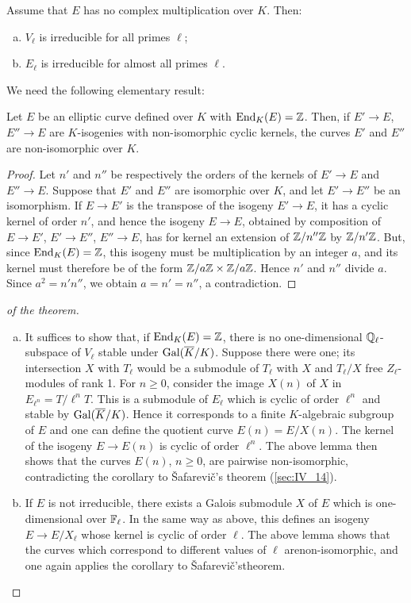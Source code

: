 \begin{thm}
Assume that $E$ has no complex multiplication over $K$.
\dpage
Then:
\begin{enumerate}[(a)]
\item\label{thm:IV_21_a} $V_\ell$ is irreducible for all primes $\ell$;
\item $E_\ell$ is irreducible for almost all primes $\ell$.
\end{enumerate}
\end{thm}

We need the following elementary result:
\begin{lem}
Let $E$ be an elliptic curve defined over $K$ with $\operatorname{End}_K(E) = \mathbb{Z}$. Then, if
$E' \to E$, $E'' \to E$ are $K$-isogenies with non-isomorphic cyclic kernels,
the curves $E'$ and $E''$ are non-isomorphic over $K$.
\end{lem}
\begin{proof}
Let $n'$ and $n''$ be respectively the orders of the kernels of
$E' \to E$ and $E'' \to E$. Suppose that $E'$ and $E''$ are isomorphic
over $K$, and let $E' \to E''$ be an isomorphism. If $E \to E'$ is the
transpose of the isogeny $E' \to E$, it has a cyclic kernel of order
$n'$, and hence the isogeny $E \to E$, obtained by composition of
$E \to E'$, $E' \to E''$, $E'' \to E$, has for kernel an extension of
$\mathbb{Z}/n''\mathbb{Z}$ by $\mathbb{Z}/n'\mathbb{Z}$. But, since $\operatorname{End}_K(E) = \mathbb{Z}$, this isogeny must be
multiplication by an integer $a$, and its kernel must therefore be of
the form $\mathbb{Z}/a\mathbb{Z} \times \mathbb{Z}/a\mathbb{Z}$. Hence $n'$ and $n''$ divide $a$. Since
$a^2 = n'n''$, we obtain $a = n' = n''$, a contradiction.
\end{proof}

\begin{proof}[ of the theorem]
\begin{enumerate}[(a)]
\item It suffices to show that, if $\operatorname{End}_K(E) = \mathbb{Z}$, there is no
	one-dimensional $\mathbb{Q}_\ell$-subspace of $V_\ell$ stable under
	$\operatorname{Gal}(\overline{K}/K)$. Suppose there were one; its intersection $X$ with
	$T_\ell$ would be a submodule of $T_\ell$ with $X$ and $T_\ell/X$ free
	$Z_\ell$-modules of rank 1. For $n \ge 0$, consider the image $X(n)$ of
	$X$ in $E_{\ell^n} = T/\ell^n T$. This is a submodule of $E_\ell$ which
	is cyclic of order $\ell^n$ and stable by $\operatorname{Gal}(\overline{K}/K)$. Hence it
	corresponds to a finite $K$-algebraic subgroup of
	\dpage
	$E$ and one can define the quotient curve $E(n) = E/X(n)$. The kernel
	of the isogeny $E \to E(n)$ is cyclic of order $\ell^n$. The above
	lemma then shows that the curves $E(n)$, $n \ge 0$, are pairwise
	non-isomorphic, contradicting the corollary to \v Safarevi\v c's
	theorem (\ref{sec:IV_14}).
\item If $E$ is not irreducible, there exists a Galois submodule $X$ of $E$
	which is one-dimensional over $\mathbb{F}_\ell$. In the same way as above, this
	defines an isogeny $E \to E/X_\ell$ whose kernel is cyclic of order
	$\ell$. The above lemma shows that the curves which correspond to
	different values of $\ell$ are\break non-isomorphic, and one again applies
	the corollary to \v Safarevi\v c's\break theorem.
	\qedhere
\end{enumerate}
\end{proof}

